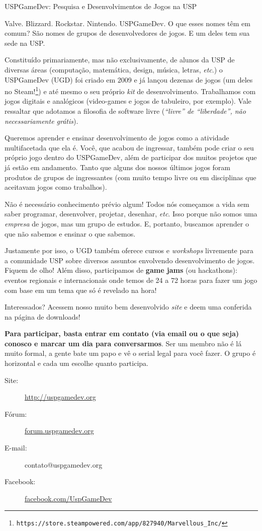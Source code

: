 ﻿\begin{subsecao}{USPGameDev: Pesquisa e Desenvolvimentos de Jogos na USP}


Valve. Blizzard. Rockstar. Nintendo. USPGameDev. O que esses nomes têm em comum?
São nomes de grupos de desenvolvedores de jogos. E um deles tem sua sede na USP.

Constituído primariamente, mas não exclusivamente, de alunos da USP de diversas
áreas (computação, matemática, design, música, letras, \textit{etc}.) o
USPGameDev (UGD) foi criado em 2009  e já lançou dezenas de jogos (um deles no 
Steam!\footnote{\texttt{https://store.steampowered.com/app/827940/Marvellous\_Inc/}}) 
e até mesmo o seu próprio \textit{kit} de desenvolvimento. Trabalhamos com jogos 
digitais e analógicos (video-games e jogos de tabuleiro, por exemplo). Vale 
ressaltar que adotamos a filosofia de software livre (\textit{``livre'' de 
``liberdade'', não necessariamente grátis}).

Queremos aprender e ensinar desenvolvimento de jogos como a atividade 
multifacetada que ela é. Você, que acabou de ingressar, também pode criar o seu 
próprio jogo dentro do USPGameDev, além de participar dos muitos projetos que já 
estão em andamento. Tanto que alguns dos nossos últimos jogos foram produtos de 
grupos de ingressantes (com muito tempo livre ou em disciplinas que aceitavam 
jogos como trabalhos). 

Não é necessário conhecimento prévio algum! Todos nós começamos a vida sem saber 
programar, desenvolver, projetar, desenhar, \textit{etc}. Isso porque não somos 
uma \textit{empresa} de jogos, mas um grupo de estudos. E, portanto, buscamos 
aprender o que não sabemos e ensinar o que sabemos.

Justamente por isso, o UGD também oferece cursos e \textit{workshops} livremente 
para a comunidade USP sobre diversos assuntos envolvendo desenvolvimento de 
jogos. Fiquem de olho! Além disso, participamos de \textbf{game jams} (ou 
hackathons): eventos regionais e internacionais onde temos de 24 a 72 horas para 
fazer um jogo com base em um tema que só é revelado na hora!

Interessados? Acessem nosso muito bem desenvolvido \textit{site} e deem uma 
conferida na página de downloads! 

\textbf{Para participar, basta entrar em contato (via email ou o que seja) 
conosco e marcar um dia para conversarmos}. Ser um membro não é lá muito formal, 
a gente bate um papo e vê o serial legal para você fazer. O grupo é horizontal e 
cada um escolhe quanto participa.

\begin{description}
  \item[Site:] \url{http://uspgamedev.org}
  \item[Fórum:] \url{forum.uspgamedev.org}
  \item[E-mail:] contato@uspgamedev.org
  \item[Facebook:] \url{facebook.com/UspGameDev}
\end{description}

\end{subsecao}
